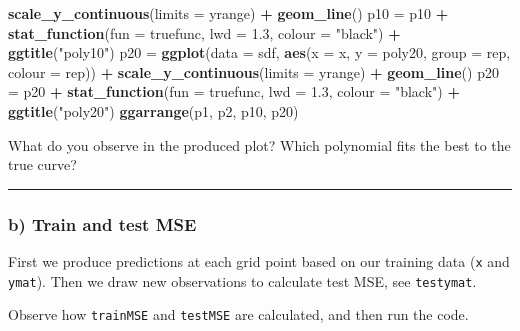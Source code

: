 \documentclass[]{article}
\newenvironment{Shaded}{\begin{snugshade}}{\end{snugshade}}
\newcommand{\DataTypeTok}[1]{\textcolor[rgb]{0.13,0.29,0.53}{#1}}
\newcommand{\FloatTok}[1]{\textcolor[rgb]{0.00,0.00,0.81}{#1}}
\newcommand{\KeywordTok}[1]{\textcolor[rgb]{0.13,0.29,0.53}{\textbf{#1}}}
\newcommand{\NormalTok}[1]{#1}
\newcommand{\OperatorTok}[1]{\textcolor[rgb]{0.81,0.36,0.00}{\textbf{#1}}}
\newcommand{\StringTok}[1]{\textcolor[rgb]{0.31,0.60,0.02}{#1}}
\begin{document}
\begin{Shaded}
\begin{Highlighting}[]
\StringTok{    }\KeywordTok{scale_y_continuous}\NormalTok{(}\DataTypeTok{limits =}\NormalTok{ yrange) }\OperatorTok{+}\StringTok{ }\KeywordTok{geom_line}\NormalTok{()}
\NormalTok{p10 =}\StringTok{ }\NormalTok{p10 }\OperatorTok{+}\StringTok{ }\KeywordTok{stat_function}\NormalTok{(}\DataTypeTok{fun =}\NormalTok{ truefunc, }\DataTypeTok{lwd =} \FloatTok{1.3}\NormalTok{, }\DataTypeTok{colour =} \StringTok{"black"}\NormalTok{) }\OperatorTok{+}\StringTok{ }
\StringTok{    }\KeywordTok{ggtitle}\NormalTok{(}\StringTok{"poly10"}\NormalTok{)}
\NormalTok{p20 =}\StringTok{ }\KeywordTok{ggplot}\NormalTok{(}\DataTypeTok{data =}\NormalTok{ sdf, }\KeywordTok{aes}\NormalTok{(}\DataTypeTok{x =}\NormalTok{ x, }\DataTypeTok{y =}\NormalTok{ poly20, }\DataTypeTok{group =}\NormalTok{ rep, }\DataTypeTok{colour =}\NormalTok{ rep)) }\OperatorTok{+}\StringTok{ }
\StringTok{    }\KeywordTok{scale_y_continuous}\NormalTok{(}\DataTypeTok{limits =}\NormalTok{ yrange) }\OperatorTok{+}\StringTok{ }\KeywordTok{geom_line}\NormalTok{()}
\NormalTok{p20 =}\StringTok{ }\NormalTok{p20 }\OperatorTok{+}\StringTok{ }\KeywordTok{stat_function}\NormalTok{(}\DataTypeTok{fun =}\NormalTok{ truefunc, }\DataTypeTok{lwd =} \FloatTok{1.3}\NormalTok{, }\DataTypeTok{colour =} \StringTok{"black"}\NormalTok{) }\OperatorTok{+}\StringTok{ }
\StringTok{    }\KeywordTok{ggtitle}\NormalTok{(}\StringTok{"poly20"}\NormalTok{)}
\KeywordTok{ggarrange}\NormalTok{(p1, p2, p10, p20)}
\end{Highlighting}
\end{Shaded}

What do you observe in the produced plot? Which polynomial fits the best
to the true curve?

\begin{center}\rule{0.5\linewidth}{0.5pt}\end{center}

\hypertarget{b-train-and-test-mse}{%
\subsubsection{b) Train and test MSE}\label{b-train-and-test-mse}}

First we produce predictions at each grid point based on our training
data (\texttt{x} and \texttt{ymat}). Then we draw new observations to
calculate test MSE, see \texttt{testymat}.

Observe how \texttt{trainMSE} and \texttt{testMSE} are calculated, and
then run the code.
\end{document}
